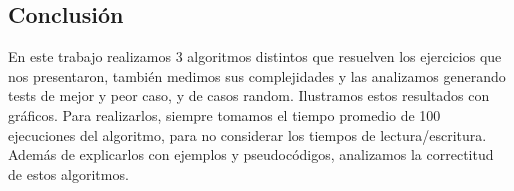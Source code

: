 \subsection{Conclusión}

En este trabajo realizamos 3 algoritmos distintos que resuelven los ejercicios que nos presentaron, también medimos sus complejidades y las analizamos generando tests de mejor y peor caso, y de casos random. Ilustramos estos resultados con gráficos. Para realizarlos, siempre tomamos el tiempo promedio de 100 ejecuciones del algoritmo, para no considerar los tiempos de lectura/escritura. Además de explicarlos con ejemplos y pseudocódigos, analizamos la correctitud de estos algoritmos.
